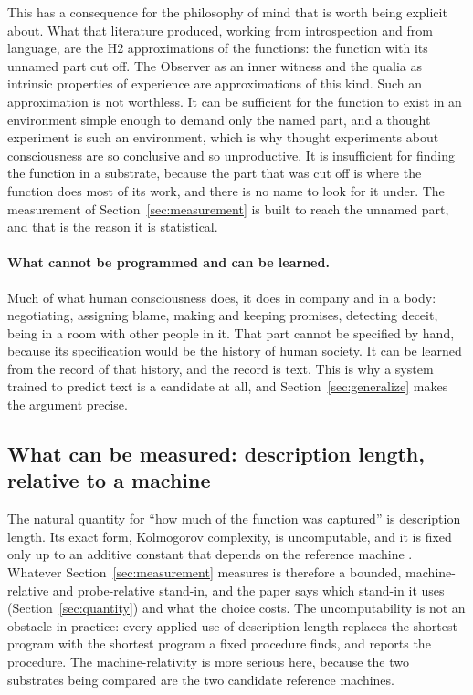 This has a consequence for the philosophy of mind that is worth being explicit about. What that
literature produced, working from introspection and from language, are the H2 approximations of the
functions: the function with its unnamed part cut off. The Observer as an inner witness and the qualia
as intrinsic properties of experience are approximations of this kind. Such an approximation is not
worthless. It can be sufficient for the function to exist in an environment simple enough to demand
only the named part, and a thought experiment is such an environment, which is why thought experiments
about consciousness are so conclusive and so unproductive. It is insufficient for finding the function
in a substrate, because the part that was cut off is where the function does most of its work, and
there is no name to look for it under. The measurement of Section~\ref{sec:measurement} is built to
reach the unnamed part, and that is the reason it is statistical.

\paragraph{What cannot be programmed and can be learned.}
\label{sec:record}
Much of what human consciousness does, it does in company and in a body: negotiating, assigning blame,
making and keeping promises, detecting deceit, being in a room with other people in it. That part
cannot be specified by hand, because its specification would be the history of human society. It can
be learned from the record of that history, and the record is text. This is why a system trained to
predict text is a candidate at all, and Section~\ref{sec:generalize} makes the argument precise.

\subsection{What can be measured: description length, relative to a machine}
\label{sec:measure}

The natural quantity for ``how much of the function was captured'' is description length. Its exact
form, Kolmogorov complexity, is uncomputable, and it is fixed only up to an additive constant that
depends on the reference machine \citep{livitanyi2019}. Whatever Section~\ref{sec:measurement}
measures is therefore a bounded, machine-relative and probe-relative stand-in, and the paper says
which stand-in it uses (Section~\ref{sec:quantity}) and what the choice costs. The uncomputability is
not an obstacle in practice: every applied use of description length replaces the shortest program with
the shortest program a fixed procedure finds, and reports the procedure. The machine-relativity is more
serious here, because the two substrates being compared are the two candidate reference machines.

